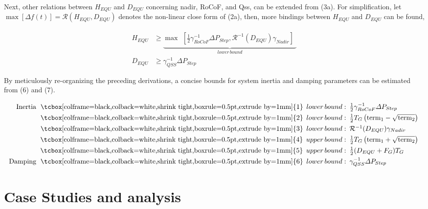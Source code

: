 \documentclass[lettersize,journal]{IEEEtran}
\newcommand{\ciao}[1]{{\setlength\fboxrule{0pt}\fbox{\tcbox[colframe=black,colback=white,shrink tight,boxrule=0.5pt,extrude by=1mm]{\small #1}}}}
\begin{document}
Next, other relations between $H_{EQU}$ and $D_{EQU}$ concerning nadir, RoCoF, and Qss, can be extended from (3a). For simplification, let $\max [ \varDelta f(t)]=\mathcal{R} (H_{EQU}, D_{EQU})$ denotes the non-linear close form of (2a), then, more bindings between $H_{EQU}$ and $D_{EQU}$ can be found,

\vspace{-0.25cm}
\begin{subequations}
  \begin{align}
H_{EQU} &\!\geq\! \underbrace{\max\!\!\! \begin{array}{l}[\frac{1}{2} \gamma_{RoCoF}^{-1} \varDelta P_{Step},\mathcal{R}^{-1}(D_{EQU}) \gamma_{Nadir}]\end{array}}_{lower\, bound} \\
D_{EQU} & \geq \gamma_{QSS}^{-1} \varDelta P_{Step}
  \end{align}
\end{subequations}

By meticulously re-organizing the preceding derivations, a concise bounds for system inertia and damping parameters can be estimated from (6) and (7).

\vspace{-0.25cm}
\begin{subequations}
  \begin{align}
    \!\!\!\begin{array}{rl}
    \text{Inertia}\,\, \ciao{1}\, lower\,bound:&\!\!\!\frac{1}{2} \gamma_{RoCoF}^{-1} \varDelta P_{Step}\\
    \ciao{2}\,lower\,bound:&\!\!\!\frac{1}{2}T_G \left(\text{term}_1 - \sqrt{\text{term}_2} \right)\\
    \ciao{3}\,lower\,bound:&\!\!\!\mathcal{R}^{-1}(D_{EQU}) \gamma_{Nadir} \\
    \ciao{4}\,upper\,bound:&\!\!\!\frac{1}{2}T_G \left(\text{term}_1 + \sqrt{\text{term}_2} \right)\\
    \ciao{5}\,upper\,bound:&\!\!\! \frac{1}{2}(D_{EQU} + F_G) T_G\\
   \text{ Damping} \,\,\ciao{6}\,lower\,bound:&\!\!\! \gamma_{QSS}^{-1} \varDelta P_{Step}\\
    \end{array}
  \end{align}
\end{subequations}

\section{Case Studies and analysis}
\end{document}
